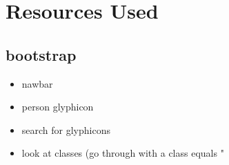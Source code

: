 \documentclass[10pt,a4paper]{article}
\begin{document}
\section{Resources Used}
	\subsection*{bootstrap}
		\begin{itemize}
			\item nawbar
			\item person glyphicon
			\item search for glyphicons
			\item look at classes (go through with a class equals "
		\end{itemize}
\end{document}
